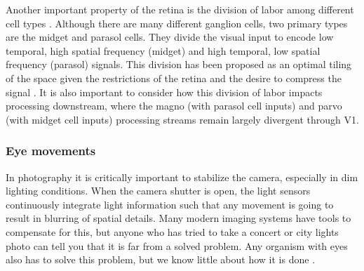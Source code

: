 Another important property of the retina is the division of labor among different cell types \parencite{van1995information}.
Although there are many different ganglion cells, two primary types are the midget and parasol cells.
They divide the visual input to encode low temporal, high spatial frequency (midget) and high temporal, low spatial frequency (parasol) signals.
This division has been proposed as an optimal tiling of the space given the restrictions of the retina and the desire to compress the signal \parencite{mcintosh2016deep, van1995information}.
It is also important to consider how this division of labor impacts processing downstream, where the magno (with parasol cell inputs) and parvo (with midget cell inputs) processing streams remain largely divergent through V1.

\subsubsection{Eye movements}
In photography it is critically important to stabilize the camera, especially in dim lighting conditions.
When the camera shutter is open, the light sensors continuously integrate light information such that any movement is going to result in blurring of spatial details.
Many modern imaging systems have tools to compensate for this, but anyone who has tried to take a concert or city lights photo can tell you that it is far from a solved problem.
Any organism with eyes also has to solve this problem, but we know little about how it is done \parencite{olshausen2010does, burak2010bayesian}.

